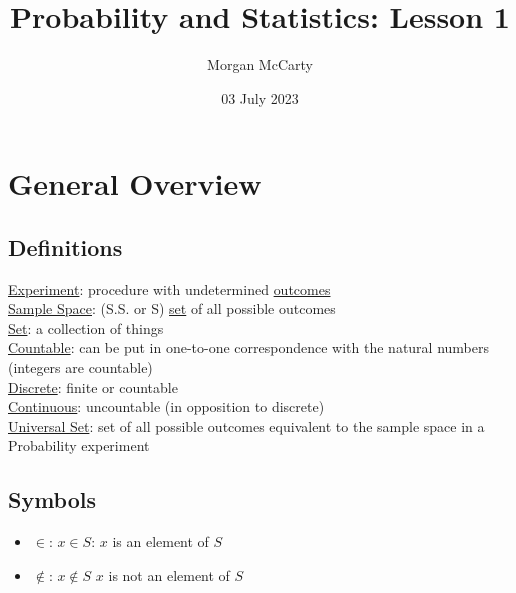 \documentclass[12pt]{article}
\title{Probability and Statistics: Lesson 1}
\author{Morgan McCarty}
\date{03 July 2023}
\begin{document}
    \maketitle

    \section{General Overview}
        \subsection{Definitions}
            \underline{Experiment}: procedure with undetermined \underline{outcomes}
            \\\underline{Sample Space}: (S.S. or S) \underline{set} of all possible outcomes
            \\\underline{Set}: a collection of things
            \\\underline{Countable}: can be put in one-to-one correspondence with the natural numbers (integers are countable)
            \\\underline{Discrete}: finite or countable
            \\\underline{Continuous}: uncountable (in opposition to discrete)
            \\\underline{Universal Set}: set of all possible outcomes equivalent to the sample space in a Probability experiment

        \subsection{Symbols}
            \begin{itemize}
                \item $\in$: $x \in S$: $x$ is an element of $S$
                \item $\notin$: $x \notin S$ $x$ is not an element of $S$
            \end{itemize}
        
\end{document}
